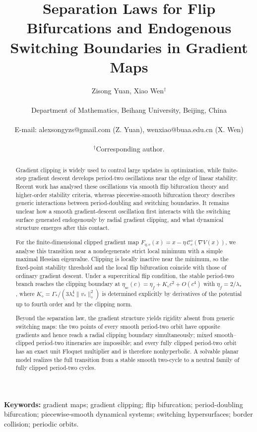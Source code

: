 \documentclass[10pt]{article}
\title{\textbf{Separation Laws for Flip Bifurcations and Endogenous
Switching Boundaries in Gradient Maps}}
\author{Zisong Yuan, Xiao Wen$^{\dagger}$\\\\
Department of Mathematics, Beihang University, Beijing, China\\\\
\normalsize E-mail: alexsongyzs@gmail.com (Z. Yuan), wenxiao@buaa.edu.cn (X. Wen)\\\\
$^{\dagger}$Corresponding author.}
\date{}
\theoremstyle{plain}
\theoremstyle{definition}
\theoremstyle{remark}
\numberwithin{equation}{section}
\begin{document}
\maketitle

\begin{abstract}
Gradient clipping is widely used to control large updates in
optimization, while finite-step gradient descent develops period-two
oscillations near the edge of linear stability.  Recent work has
analysed these oscillations via smooth flip bifurcation theory and
higher-order stability criteria, whereas piecewise-smooth bifurcation
theory describes generic interactions between period-doubling and
switching boundaries.  It remains unclear how a smooth
gradient-descent oscillation first interacts with the switching
surface generated endogenously by radial gradient clipping, and what
dynamical structure emerges after this contact.

For the finite-dimensional clipped gradient map
$F_{\eta,c}(x)=x-\eta\,\mathcal C_c^\diamond(\nabla V(x))$,
we analyse this transition near a nondegenerate strict local minimum
with a simple maximal Hessian eigenvalue.  Clipping is locally
inactive near the minimum, so the fixed-point stability threshold and
the local flip bifurcation coincide with those of ordinary gradient
descent.  Under a supercritical flip condition, the stable period-two
branch reaches the clipping boundary at
$\eta_{\mathrm{sc}}(c)=\eta_f+K_\diamond c^2+O(c^4)$ with
$\eta_f=2/\lambda_*$, where
$K_\diamond=\Gamma_*/(3\lambda_*^4\|v_*\|_\diamond^2)$
is determined explicitly by derivatives of the potential up to fourth
order and by the clipping norm.

Beyond the separation law, the gradient structure yields rigidity
absent from generic switching maps: the two points of every smooth
period-two orbit have opposite gradients and hence reach a radial
clipping boundary simultaneously; mixed smooth--clipped period-two
itineraries are impossible; and every fully clipped period-two orbit
has an exact unit Floquet multiplier and is therefore nonhyperbolic.
A solvable planar model realizes the full transition from a stable
smooth two-cycle to a neutral family of fully clipped period-two
cycles.
\end{abstract}

\noindent\textbf{Keywords:} gradient maps; gradient clipping; flip
bifurcation; period-doubling bifurcation; piecewise-smooth dynamical
systems; switching hypersurfaces; border collision; periodic orbits.
\end{document}
